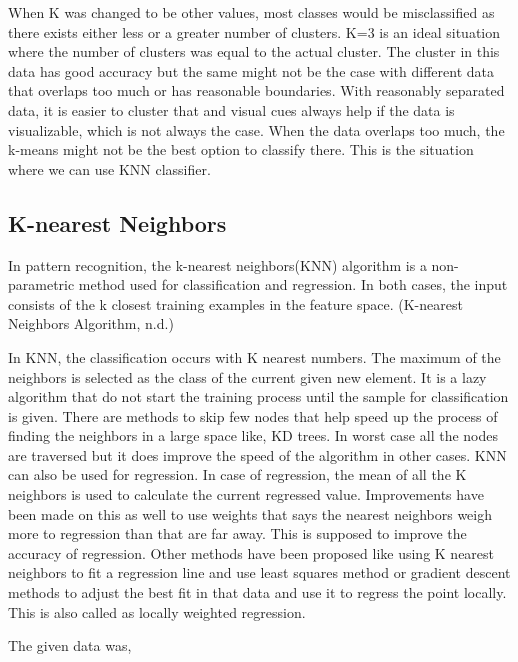 \documentclass{article} %
\begin{document}
\noindent When K was changed to be other values, most classes would be misclassified as there exists either less or a greater number of clusters. K=3 is an ideal situation where the number of clusters was equal to the actual cluster. The cluster in this data has good accuracy but the same might not be the case with different data that overlaps too much or has reasonable boundaries. With reasonably separated data, it is easier to cluster that and visual cues always help if the data is visualizable, which is not always the case. When the data overlaps too much, the k-means might not be the best option to classify there. This is the situation where we can use KNN classifier. 

\noindent 

\noindent 

\noindent 
\subsection{K-nearest Neighbors}

\noindent In pattern recognition, the k-nearest neighbors(KNN) algorithm is a non-parametric method used for classification and regression. In both cases, the input consists of the k closest training examples in the feature space. (K-nearest Neighbors Algorithm, n.d.)

\noindent In KNN, the classification occurs with K nearest numbers. The maximum of the neighbors is selected as the class of the current given new element. It is a lazy algorithm that do not start the training process until the sample for classification is given. There are methods to skip few nodes that help speed up the process of finding the neighbors in a large space like, KD trees. In worst case all the nodes are traversed but it does improve the speed of the algorithm in other cases. KNN can also be used for regression. In case of regression, the mean of all the K neighbors is used to calculate the current regressed value. Improvements have been made on this as well to use weights that says the nearest neighbors weigh more to regression than that are far away. This is supposed to improve the accuracy of regression. Other methods have been proposed like using K nearest neighbors to fit a regression line and use least squares method or gradient descent methods to adjust the best fit in that data and use it to regress the point locally. This is also called as locally weighted regression. 

\noindent 

\noindent The given data was, 
\end{document}
